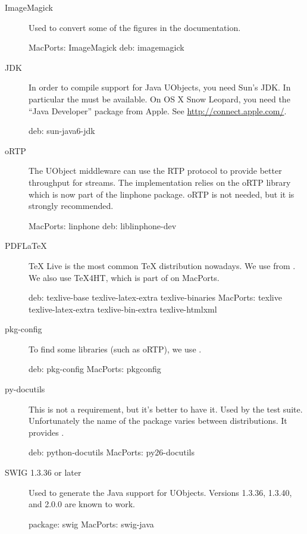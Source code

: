 \begin{description}
\item[ImageMagick] Used to convert some of the figures in the
  documentation.
\begin{package}
MacPorts: ImageMagick
deb: imagemagick
\end{package}

\item[JDK] In order to compile support for Java UObjects, you need Sun's
  JDK.  In particular the  must be available.  On OS X Snow
  Leopard, you need the ``Java Developer'' package from Apple.  See
  \url{http://connect.apple.com/}.
\begin{package}
deb: sun-java6-jdk
\end{package}

\item[oRTP] The UObject middleware can use the RTP protocol to provide
  better throughput for streams.  The implementation relies on the oRTP
  library which is now part of the linphone package.  oRTP is not needed,
  but it is strongly recommended.
\begin{package}
MacPorts: linphone
deb: liblinphone-dev
\end{package}

\item[PDFLaTeX] TeX Live is the most common \TeX{} distribution nowadays.
  We use  from .  We also use
  TeX4HT, which is part of  on MacPorts.
\begin{package}
deb: texlive-base texlive-latex-extra texlive-binaries
MacPorts: texlive texlive-latex-extra texlive-bin-extra texlive-htmlxml
\end{package}

\item[pkg-config] To find some libraries (such as oRTP), we use
  .
\begin{package}
deb: pkg-config
MacPorts: pkgconfig
\end{package}

\item[py-docutils] This is not a requirement, but it's better to have
  it.  Used by the test suite.  Unfortunately the name of the package
  varies between distributions.  It provides .
\begin{package}
deb: python-docutils
MacPorts: py26-docutils
\end{package}

\item[SWIG 1.3.36 or later] Used to generate the Java support for UObjects.
  Versions 1.3.36, 1.3.40, and 2.0.0 are known to work.
\begin{package}
package: swig
MacPorts: swig-java
\end{package}


\end{description}
